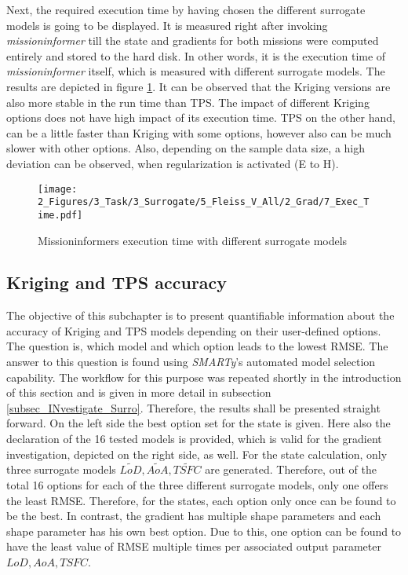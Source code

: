 \FloatBarrier
Next, the required execution time by having chosen 
the different surrogate models is going to be 
displayed. It is measured 
right after invoking \emph{missioninformer} till
the state and gradients for both missions were computed entirely
and stored to the hard disk. In other words, it is 
the execution time of \emph{missioninformer} itself, which 
is measured with different surrogate models.
The results are depicted in figure \ref{fig_112}.
It can be observed that the Kriging versions 
are also more stable in the run time 
than TPS. The impact of different Kriging 
options does not have high impact of 
its execution time. TPS on the other hand, 
can be a little faster than Kriging with some options, however
also can be much slower with other options.
Also, depending on the sample data size, 
a high deviation can be observed, when 
regularization is activated (E to H).


\begin{figure}[!h]
        \centering
        \texttt{[image: 2\_Figures/3\_Task/3\_Surrogate/5\_Fleiss\_V\_All/2\_Grad/7\_Exec\_Time.pdf]}
        \caption{Missioninformers execution time with different surrogate models}
        \label{fig_112}    
\end{figure} 

\FloatBarrier
\subsection{Kriging and TPS accuracy}
\label{subsec_Krig_TPS_Accu}
The objective of this subchapter is to 
present quantifiable information about the accuracy
of Kriging and TPS models 
depending on their user-defined options. The question is, 
which model and which option leads to the 
lowest RMSE. The answer 
to this question is found using 
\emph{SMARTy}'s automated model 
selection capability. The workflow for this 
purpose was repeated shortly in the introduction 
of this section and is given in more detail 
in subsection \ref{subsec_INvestigate_Surro}.
Therefore, the results shall be 
presented straight forward. On the left 
side the best option set for the state 
is given. Here also the declaration 
of the 16 tested models is provided, which 
is valid for the gradient investigation, depicted
on the right side, as well.
For the state calculation, only three 
surrogate models $\tilde{LoD}, \tilde{AoA}, \tilde{TSFC}$
are generated. Therefore, out of the total 16 
options for each of the three different 
surrogate models, only one offers the least 
RMSE. Therefore, for the states, each option 
only once can be found to be the best.
In contrast, the gradient has 
multiple shape parameters and each shape parameter 
has his own best option. Due to this, one 
option can be found to have the least value of 
RMSE multiple times per associated output 
parameter $LoD, AoA, TSFC$.\newline

